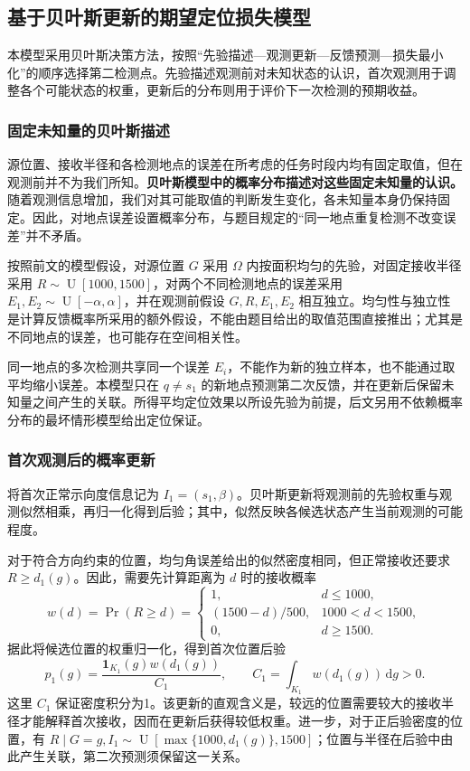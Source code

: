\documentclass[UTF8,a4paper,zihao=-4,fontset=none]{ctexart}
\begin{document}
\subsection{基于贝叶斯更新的期望定位损失模型}

本模型采用贝叶斯决策方法，按照“先验描述—观测更新—反馈预测—损失最小化”的顺序选择第二检测点。先验描述观测前对未知状态的认识，首次观测用于调整各个可能状态的权重，更新后的分布则用于评价下一次检测的预期收益。

\subsubsection{固定未知量的贝叶斯描述}

源位置、接收半径和各检测地点的误差在所考虑的任务时段内均有固定取值，但在观测前并不为我们所知。\textbf{贝叶斯模型中的概率分布描述对这些固定未知量的认识。} 随着观测信息增加，我们对其可能取值的判断发生变化，各未知量本身仍保持固定。因此，对地点误差设置概率分布，与题目规定的“同一地点重复检测不改变误差”并不矛盾。

按照前文的模型假设，对源位置 \(G\) 采用 \(\Omega\) 内按面积均匀的先验，对固定接收半径采用 \(R\sim\operatorname{U}[1000,1500]\)，对两个不同检测地点的误差采用 \(E_1,E_2\sim\operatorname{U}[-\alpha,\alpha]\)，并在观测前假设 \(G,R,E_1,E_2\) 相互独立。均匀性与独立性是计算反馈概率所采用的额外假设，不能由题目给出的取值范围直接推出；尤其是不同地点的误差，也可能存在空间相关性。

同一地点的多次检测共享同一个误差 \(E_i\)，不能作为新的独立样本，也不能通过取平均缩小误差。本模型只在 \(q\ne s_1\) 的新地点预测第二次反馈，并在更新后保留未知量之间产生的关联。所得平均定位效果以所设先验为前提，后文另用不依赖概率分布的最坏情形模型给出定位保证。

\subsubsection{首次观测后的概率更新}

将首次正常示向度信息记为 \(I_1=(s_1,\beta)\)。贝叶斯更新将观测前的先验权重与观测似然相乘，再归一化得到后验；其中，似然反映各候选状态产生当前观测的可能程度。

对于符合方向约束的位置，均匀角误差给出的似然密度相同，但正常接收还要求 \(R\ge d_1(g)\)。因此，需要先计算距离为 \(d\) 时的接收概率
\begin{equation}
 w(d)=\Pr(R\ge d)=
 \begin{cases}
 1,&d\le1000,\\
 (1500-d)/500,&1000<d<1500,\\
 0,&d\ge1500.
 \end{cases}
\label{eq:q2-pair-weight}
\end{equation}
据此将候选位置的权重归一化，得到首次位置后验
\begin{equation}
 p_1(g)=\frac{\mathbf1_{K_1}(g)w(d_1(g))}{C_1},
 \qquad C_1=\int_{K_1}w(d_1(g))\,\mathrm dg>0.
\label{eq:q2-pair-posterior}
\end{equation}
这里 \(C_1\) 保证密度积分为1。该更新的直观含义是，较远的位置需要较大的接收半径才能解释首次接收，因而在更新后获得较低权重。进一步，对于正后验密度的位置，有 \(R\mid G=g,I_1\sim\operatorname{U}[\max\{1000,d_1(g)\},1500]\)；位置与半径在后验中由此产生关联，第二次预测须保留这一关系。
\end{document}

